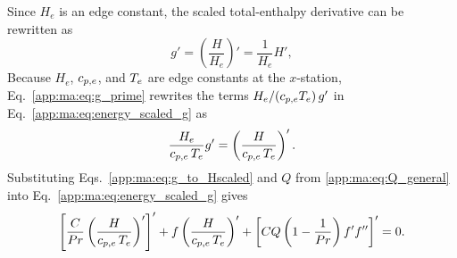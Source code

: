 Since \(H_e\) is an edge constant, the scaled total-enthalpy derivative can be rewritten as
\begin{equation}
  g'=\left(\frac{H}{H_e}\right)'=\frac{1}{H_e}H',
  \label{app:ma:eq:g_prime}
\end{equation}
Because \(H_e\), \(c_{p,e}\), and \(T_e\) are edge constants at the \(x\)-station, Eq.~\eqref{app:ma:eq:g_prime} rewrites the terms \(H_e/(c_{p,e}T_e)\,g'\) in Eq.~\eqref{app:ma:eq:energy_scaled_g} as
\begin{equation}
  \frac{H_e}{c_{p,e}\,T_e}g'
  =
  \left(\frac{H}{c_{p,e}\,T_e}\right)'.
  \label{app:ma:eq:g_to_Hscaled}
\end{equation}
Substituting Eqs.~\eqref{app:ma:eq:g_to_Hscaled} and \(Q\) from \eqref{app:ma:eq:Q_general} into Eq.~\eqref{app:ma:eq:energy_scaled_g} gives
\begin{equation}
  \left[
    \frac{C}{Pr}
    \left(\frac{H}{c_{p,e}\,T_e}\right)'
  \right]'
  +
  f
  \left(\frac{H}{c_{p,e}\,T_e}\right)'
  +
  \left[
    CQ\left(1-\frac{1}{Pr}\right)f'f''
  \right]'=0.
  \label{app:ma:eq:energy_scaled_H}
\end{equation}

